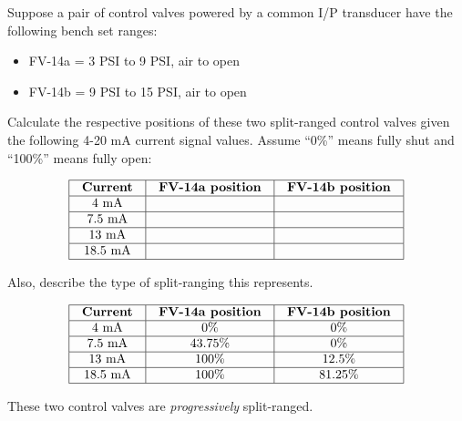 

Suppose a pair of control valves powered by a common I/P transducer have the following bench set ranges:

\begin{itemize}
\item{} FV-14a = 3 PSI to 9 PSI, air to open
\item{} FV-14b = 9 PSI to 15 PSI, air to open
\end{itemize}

Calculate the respective positions of these two split-ranged control valves given the following 4-20 mA current signal values.  Assume ``0\%'' means fully shut and ``100\%'' means fully open:


$$\vbox{\offinterlineskip
\halign{\strut
\vrule \quad\hfil # \ \hfil & 
\vrule \quad\hfil # \ \hfil & 
\vrule \quad\hfil # \ \hfil \vrule \cr
\noalign{\hrule}
%
{\bf Current} & {\bf FV-14a position} & {\bf FV-14b position} \cr
%
\noalign{\hrule}
%
4 mA &  &  \cr
%
\noalign{\hrule}
%
7.5 mA &  &  \cr
%
\noalign{\hrule}
%
13 mA &  &  \cr
%
\noalign{\hrule}
%
18.5 mA &  &  \cr
%
\noalign{\hrule}
} %
}$$ %

Also, describe the type of split-ranging this represents.








$$\vbox{\offinterlineskip
\halign{\strut
\vrule \quad\hfil # \ \hfil & 
\vrule \quad\hfil # \ \hfil & 
\vrule \quad\hfil # \ \hfil \vrule \cr
\noalign{\hrule}
%
{\bf Current} & {\bf FV-14a position} & {\bf FV-14b position} \cr
%
\noalign{\hrule}
%
4 mA & 0\% & 0\% \cr
%
\noalign{\hrule}
%
7.5 mA & 43.75\% & 0\% \cr
%
\noalign{\hrule}
%
13 mA & 100\% & 12.5\% \cr
%
\noalign{\hrule}
%
18.5 mA & 100\% & 81.25\% \cr
%
\noalign{\hrule}
} %
}$$ %

These two control valves are {\it progressively} split-ranged.











